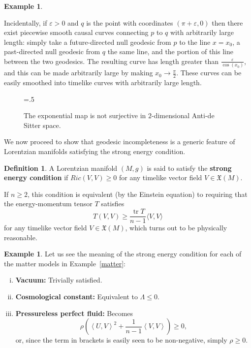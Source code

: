 \documentclass[12pt]{amsart}
\newcommand{\tr}{\operatorname{tr}}
\newcommand{\cX}{\mathfrak{X}}
\theoremstyle{definition}
\newtheorem{Def}[Thm]{Definition}
\newtheorem{Example}[Thm]{Example}
\theoremstyle{remark}
\begin{document}
\begin{Example}
\begin{enumerate}[(i)]
Incidentally, if $\varepsilon > 0$ and $q$ is the point with coordinates $(\pi + \varepsilon, 0)$ then there exist piecewise smooth causal curves connecting $p$ to $q$ with arbitrarily large length: simply take a future-directed null geodesic from $p$ to the line $x=x_0$, a past-directed null geodesic from $q$ the same line, and the portion of this line between the two geodesics. The resulting curve has length greater than $\frac{\varepsilon}{\cos(x_0)}$, and this can be made arbitrarily large by making $x_0 \to \frac\pi2$. These curves can be easily smoothed into timelike curves with arbitrarily large length.
\end{enumerate}
\end{Example}

\begin{figure}[h!]
\begin{center}
\epsfxsize=.5\textwidth
\leavevmode
{}
\end{center}
\caption{The exponential map is not surjective in $2$-dimensional Anti-de Sitter space.} \label{AdS}
\end{figure}

We now proceed to show that geodesic incompleteness is a generic feature of Lorentzian manifolds satisfying the strong energy condition.

\begin{Def}
A Lorentzian manifold $(M,g)$ is said to satisfy the {\bf strong energy condition} if $Ric(V,V) \geq 0$ for any timelike vector field $V \in \cX(M)$.
\end{Def}

If $n \geq 2$, this condition is equivalent (by the Einstein equation) to requiring that the energy-momentum tensor $T$ satisfies 
\[
T(V,V) \geq \frac{\tr T}{n-1} \langle V, V \rangle
\]
for any timelike vector field $V \in \cX(M)$, which turns out to be physically reasonable.

\begin{Example} Let us see the meaning of the strong energy condition for each of the matter models in Example~\ref{matter}:
\begin{enumerate}[(i)]
\item
{\bf Vacuum:} Trivially satisfied.
\item
{\bf Cosmological constant:} Equivalent to $\Lambda \leq 0$.
\item
{\bf Pressureless perfect fluid:} Becomes
\[
\rho \left( \left\langle U,V \right\rangle^2 + \frac1{n-1} \left\langle V,V \right\rangle \right) \geq 0,
\]
or, since the term in brackets is easily seen to be non-negative, simply $\rho \geq 0$.
\end{enumerate}
\end{Example}
\end{document}
